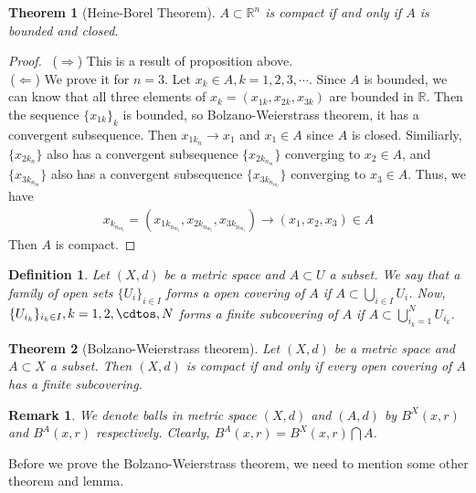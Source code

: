 \documentclass[12pt,leqno]{amsart}
\newtheorem{theorem}{Theorem}[section]
\newtheorem{definition}{Definition}[section]
\newtheorem{remark}{Remark}[section]
\theoremstyle{definition}
\begin{document}
\begin{theorem}[Heine-Borel Theorem]
$A\subset \mathbb{R}^n$ is compact if and only if $A$ is bounded and closed.
\end{theorem}
\begin{proof}
$ $\newline
\hspace*{1em}\,($\Rightarrow$) This is a result of proposition above. \\
\hspace*{1em}\,($\Leftarrow$) We prove it for $n = 3$. Let $x_k\in A, k = 1,2,3,\cdots$. Since $A$ is bounded, we can know that all three elements of $x_k = (x_{1k},x_{2k},x_{3k})$ are bounded in $\mathbb{R}$. Then the sequence $\{x_{1k}\}_k$ is bounded, so Bolzano-Weierstrass theorem, it has a convergent subsequence. Then $x_{1k_n}\to x_1$ and $x_1\in A$ since $A$ is closed. Similiarly, $\{x_{2k_n}\}$ also has a convergent subsequence $\{x_{2k_{n_m}}\}$ converging to $x_2\in A$, and $\{x_{3k_{n_m}}\}$ also has a convergent subsequence $\{x_{3k_{n_{m_l}}}\}$ converging to $x_3\in A$. Thus, we have 
\begin{align*}
    x_{k_{n_{m_l}}} = \left(x_{1k_{n_{m_l}}},x_{2k_{n_{m_l}}},x_{3k_{n_{m_l}}}\right)\to (x_1,x_2,x_3)\in A
\end{align*}
Then $A$ is compact.
\end{proof}

\medskip

\begin{definition}
Let $(X,d)$ be a metric space and $A\subset U$ a subset. We say that a family of open sets $\{U_i\}_{i\in I}$ forms a open covering of $A$ if $A\subset \bigcup_{i\in I} U_i$. Now, $\{U_{i_k}\}_{i_k\in I}, k = 1,2,\cdtos,N$ forms a finite subcovering of $A$ if $A\subset \bigcup_{i_k=1}^N U_{i_k}$.
\end{definition}

\medskip

\begin{theorem}[Bolzano-Weierstrass theorem]
Let $(X,d)$ be a metric space and $A\subset X$ a subset. Then $(X,d)$ is compact if and only if every open covering of $A$ has a finite subcovering.
\end{theorem}
\begin{remark}
We denote balls in metric space $(X,d)$ and $(A,d)$ by $B^X(x,r)$ and $B^A(x,r)$ respectively. Clearly, $B^A(x,r) = B^X(x,r)\bigcap A$.
\end{remark}

Before we prove the Bolzano-Weierstrass theorem, we need to mention some other theorem and lemma. 
\end{document}
